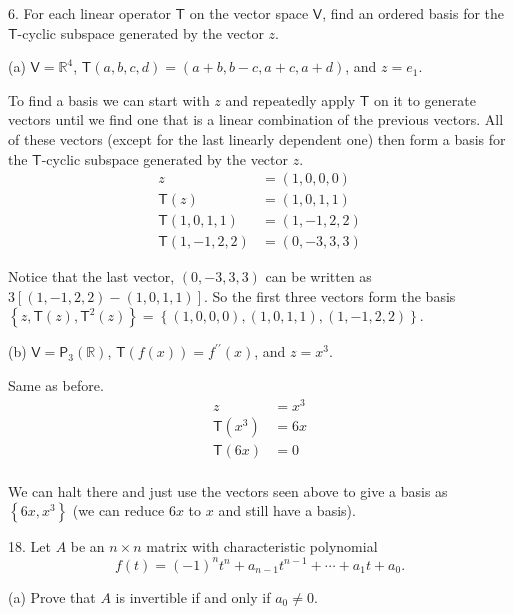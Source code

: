 \documentclass[11pt]{article}
\newcommand{\sbr}[1]{\left[#1\right]}
\newcommand{\cbr}[1]{\left\{#1\right\}}
\newcommand{\dprime}{\prime\prime}
\begin{document}
6. For each linear operator $\mathsf{T}$ on the vector space $\mathsf{V}$, find an ordered basis for the $\mathsf{T}$-cyclic subspace generated by the vector $z$.

(a) $\mathsf{V} = \mathbb{R}^4$, $\mathsf{T}(a,b,c,d) = (a+b,b-c,a+c,a+d)$, and $z=e_1$.

To find a basis we can start with $z$ and repeatedly apply $\mathsf{T}$ on it to generate vectors until we find one that is a linear combination of the previous vectors. All of these vectors (except for the last linearly dependent one) then form a basis for the $\mathsf{T}$-cyclic subspace generated by the vector $z$. \begin{align*}
  z &= (1,0,0,0) \\
  \mathsf{T}(z) &= (1,0,1,1) \\
  \mathsf{T}(1,0,1,1) &= (1,-1,2,2) \\
  \mathsf{T}(1,-1,2,2) &= (0,-3, 3, 3)
\end{align*}

Notice that the last vector, $(0,-3,3,3)$ can be written as $3\sbr{(1,-1,2,2) - (1,0,1,1)}$. So the first three vectors form the basis $\cbr{z,\mathsf{T}(z), \mathsf{T}^2(z)} = \cbr{(1,0,0,0), (1,0,1,1), (1,-1,2,2)}$.

(b) $\mathsf{V} = \mathsf{P}_3(\mathbb{R})$, $\mathsf{T}(f(x)) = f^{\dprime}(x)$, and $z=x^3$.

Same as before. \begin{align*}
  z &= x^3 \\
  \mathsf{T}(x^3) &= 6x \\
  \mathsf{T}(6x) &= 0 \\
\end{align*}

We can halt there and just use the vectors seen above to give a basis as $\cbr{6x,x^3}$ (we can reduce $6x$ to $x$ and still have a basis).

18. Let $A$ be an $n\times n$ matrix with characteristic polynomial $$f(t) = (-1)^n t^n+a_{n-1}t^{n-1}+ \cdots + a_1t+a_0.$$

(a) Prove that $A$ is invertible if and only if $a_0\neq 0$.
\end{document}
